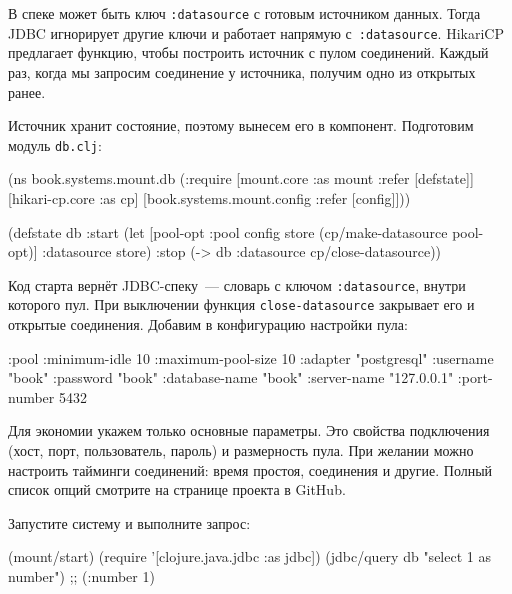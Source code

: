В спеке может быть ключ \verb|:datasource| с готовым источником данных. Тогда
JDBC игнорирует другие ключи и работает напрямую с~\verb|:datasource|. HikariCP
предлагает функцию, чтобы построить источник с пулом соединений. Каждый раз,
когда мы запросим соединение у источника, получим одно из открытых ранее.


Источник хранит состояние, поэтому вынесем его в компонент. Подготовим модуль
\verb|db.clj|:

\begin{english}
  \begin{clojure}
(ns book.systems.mount.db
  (:require
   [mount.core :as mount :refer [defstate]]
   [hikari-cp.core :as cp]
   [book.systems.mount.config :refer [config]]))

(defstate db
  :start
  (let [{pool-opt :pool} config
        store (cp/make-datasource pool-opt)]
    {:datasource store})
  :stop
  (-> db :datasource cp/close-datasource))
  \end{clojure}
\end{english}


Код старта вернёт JDBC-спеку~--- словарь с ключом \verb|:datasource|, внутри
которого пул. При выключении функция \verb|close-datasource| закрывает его и
открытые соединения. Добавим в конфигурацию настройки пула:

\begin{english}
  \begin{clojure}
{:pool {:minimum-idle       10
        :maximum-pool-size  10
        :adapter            "postgresql"
        :username           "book"
        :password           "book"
        :database-name      "book"
        :server-name        "127.0.0.1"
        :port-number        5432}}
  \end{clojure}
\end{english}

Для экономии укажем только основные параметры. Это свойства подключения (хост,
порт, пользователь, пароль) и размерность пула. При желании можно настроить
тайминги соединений: время простоя, соединения и другие. Полный список опций
смотрите на странице проекта в GitHub.

Запустите систему и выполните запрос:

\begin{english}
  \begin{clojure}
(mount/start)
(require '[clojure.java.jdbc :as jdbc])
(jdbc/query db "select 1 as number")
;; ({:number 1})
  \end{clojure}
\end{english}

